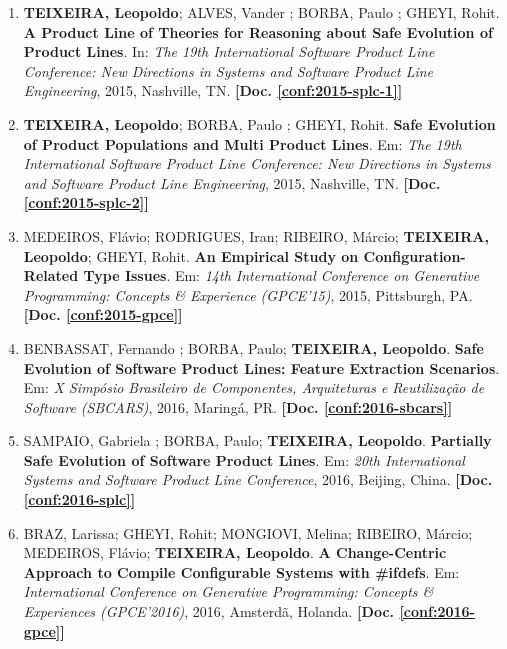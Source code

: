 \documentclass[a4paper,oneside,10pt]{article}
\begin{document}
\begin{enumerate}
\renewcommand{\labelenumi}{{\large\bfseries\arabic{enumi}.}}

\item \textbf{TEIXEIRA, Leopoldo}; ALVES, Vander ; BORBA, Paulo ; GHEYI, Rohit. \textbf{A Product Line of Theories for Reasoning about Safe Evolution of Product Lines}. In: \emph{The 19th International Software Product Line Conference: New Directions in Systems and Software Product Line Engineering}, 2015, Nashville, TN. \textbf{[Doc. \ref{conf:2015-splc-1}]}
%
\item \textbf{TEIXEIRA, Leopoldo}; BORBA, Paulo ; GHEYI, Rohit. \textbf{Safe Evolution of Product Populations and Multi Product Lines}. Em: \emph{The 19th International Software Product Line Conference: New Directions in Systems and Software Product Line Engineering}, 2015, Nashville, TN. \textbf{[Doc. \ref{conf:2015-splc-2}]}
%
\item MEDEIROS, Flávio; RODRIGUES, Iran; RIBEIRO, Márcio; \textbf{TEIXEIRA, Leopoldo};  GHEYI, Rohit. \textbf{An Empirical Study on Configuration-Related Type Issues}. Em: \emph{14th International Conference on Generative Programming: Concepts \& Experience (GPCE'15)}, 2015, Pittsburgh, PA. \textbf{[Doc. \ref{conf:2015-gpce}]}

\item BENBASSAT, Fernando ; BORBA, Paulo; \textbf{TEIXEIRA, Leopoldo}. \textbf{Safe Evolution of Software Product Lines: Feature Extraction Scenarios}. Em: \emph{X Simpósio Brasileiro de Componentes, Arquiteturas e Reutilização de Software (SBCARS)}, 2016, Maringá, PR. \textbf{[Doc. \ref{conf:2016-sbcars}]}

\item SAMPAIO, Gabriela ; BORBA, Paulo; \textbf{TEIXEIRA, Leopoldo}. \textbf{Partially Safe Evolution of Software Product Lines}. Em: \emph{20th International Systems and Software Product Line Conference}, 2016, Beijing, China. \textbf{[Doc. \ref{conf:2016-splc}]}

\item BRAZ, Larissa; GHEYI, Rohit; MONGIOVI, Melina; RIBEIRO, Márcio; MEDEIROS, Flávio; \textbf{TEIXEIRA, Leopoldo}. \textbf{A Change-Centric Approach to Compile Configurable Systems with \#ifdefs}. Em: \emph{International Conference on Generative Programming: Concepts \& Experiences (GPCE'2016)}, 2016, Amsterdã, Holanda. \textbf{[Doc. \ref{conf:2016-gpce}]}

\end{enumerate}
\end{document}
